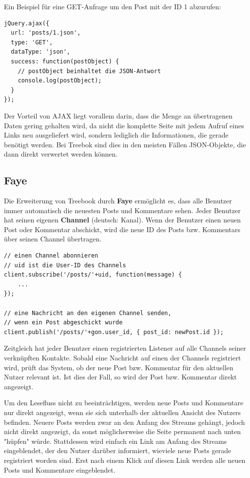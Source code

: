 \documentclass[10pt,a4paper]{book}
\begin{document}
Ein Beispiel für eine GET-Anfrage um den Post mit der ID 1 abzurufen:
\begin{lstlisting}
jQuery.ajax({
  url: 'posts/1.json',
  type: 'GET',
  dataType: 'json',
  success: function(postObject) {
    // postObject beinhaltet die JSON-Antwort
    console.log(postObject);
  }
});
\end{lstlisting}

Der Vorteil von AJAX liegt vorallem darin, dass die Menge an übertragenen Daten gering gehalten wird, da nicht die komplette Seite mit jedem Aufruf eines Links neu ausgeliefert wird, sondern lediglich die Informationen, die gerade benötigt werden.
Bei Treebok sind dies in den meisten Fällen JSON-Objekte, die dann direkt verwertet werden können.

\subsection{Faye}
Die Erweiterung von Treebook durch \textbf{Faye} ermöglicht es, dass alle Benutzer immer automatisch die neuesten Posts und Kommentare sehen.
Jeder Benutzer hat seinen eigenen \textbf{Channel} (deutsch: Kanal). Wenn der Benutzer einen neuen Post oder Kommentar abschickt, wird die neue ID des Posts bzw. Kommentars über seinen Channel übertragen.
\begin{lstlisting}
// einen Channel abonnieren
// uid ist die User-ID des Channels
client.subscribe('/posts/'+uid, function(message) {
    ...
});

// eine Nachricht an den eigenen Channel senden,
// wenn ein Post abgeschickt wurde
client.publish('/posts/'+gon.user_id, { post_id: newPost.id });
\end{lstlisting}
Zeitgleich hat jeder Benutzer einen registrierten Listener auf alle Channels seiner verknüpften Kontakte. Sobald eine Nachricht auf einen der Channels registriert wird, prüft das System, ob der neue Post bzw. Kommentar für den aktuellen Nutzer relevant ist. Ist dies der Fall, so wird der Post bzw. Kommentar direkt angezeigt.

Um den Lesefluss nicht zu beeinträchtigen, werden neue Posts und Kommentare nur direkt angezeigt, wenn sie sich unterhalb der aktuellen Ansicht des Nutzers befinden.
Neuere Posts werden zwar an den Anfang des Streams gehängt, jedoch nicht direkt angezeigt, da sonst möglicherweise die Seite permanent nach unten "hüpfen" würde.
Stattdessen wird einfach ein Link am Anfang des Streams eingeblendet, der den Nutzer darüber informiert, wieviele neue Posts gerade registriert worden sind. Erst nach einem Klick auf diesen Link werden alle neuen Posts und Kommentare eingeblendet.
\end{document}
